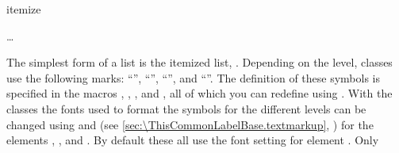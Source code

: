  \begin{Declaration}
    \begin{Environment}{itemize}
      \begin{Body}
         \dots
        \BodyDots
      \end{Body}
    \end{Environment}
  \end{Declaration}%
  The simplest form of a list is the itemized list,
  . %
  %
  Depending on the level, \KOMAScript{} classes use the following marks:
  ``{}'', ``{}'', ``{}'', and
  ``{}''. The definition of these symbols is specified in the
  macros , , , and
  , all of which you can redefine using
  .
  With the \KOMAScript{} classes the
  fonts used to format the symbols for the
  different levels can be changed using
   and
   (see
  \autoref{sec:\ThisCommonLabelBase.textmarkup},
  ) for the elements
  ,
  ,
   and
  . By default
  these all use the font setting for element
  . Only
